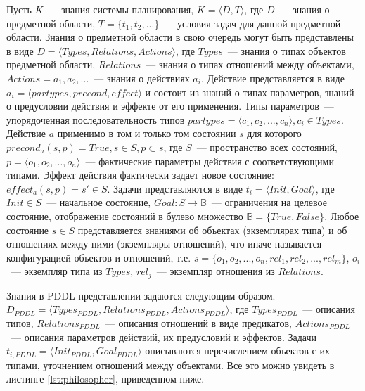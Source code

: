    \par  Пусть $K$~--- знания системы планирования, $K = \langle D, T \rangle$, где $D$~--- знания о предметной области,
    $T = \{t_1, t_2, ...\}$~--- условия задач для данной предметной области.
 Знания о предметной области в свою очередь могут быть представлены в виде $D = \langle Types, Relations, Actions \rangle$, где $Types$~--- знания о типах объектов предметной области, $Relations$~--- знания о типах отношений между объектами, $Actions = {a_1, a_2, ...}$~--- знания о действиях $a_i$.
 Действие представляется в виде $a_i = \langle partypes, precond, effect \rangle$ и состоит из знаний о типах параметров, знаний о предусловии действия и эффекте от его применения.
 Типы параметров~--- упорядоченная последовательность типов $ partypes = \langle c_1, c_2, ..., c_n \rangle, c_i \in Types$.
 Действие $a$ применимо в том и только том состоянии $s$ для которого $precond_a(s,p) = True, s \in S, p \subset s$, где $S$~--- пространство всех состояний, $p = \langle o_1, o_2, ..., o_n \rangle$~--- фактические параметры действия с соответствующими типами.
 Эффект действия фактически задает новое состояние: $effect_a(s, p) = s' \in S$.
 Задачи представляются в виде $t_i = \langle Init, Goal \rangle$, где $Init \in S$~--- начальное состояние, $Goal: S \rightarrow \mathbb{B}$~--- ограничения на целевое состояние, отображение состояний в булево множество $\mathbb{B} = \{ True, False\}$.
 Любое состояние $s \in S$ представляется знаниями об объектах (экземплярах типа) и об отношениях между ними (экземпляры отношений), что иначе называется конфигурацией объектов и отношений, т.е.
 $s = \{o_1, o_2, ..., o_n, rel_1, rel_2, ..., rel_m\}$, $o_i$~--- экземпляр типа из $Types$, $rel_j$~--- экземпляр отношения из $Relations$.
    
    Знания в PDDL-представлении задаются следующим образом.
 $D_{PDDL} = \langle Types_{PDDL}, Relations_{PDDL}, Actions_{PDDL} \rangle$, где $Types_{PDDL}$~--- описания типов, $Relations_{PDDL}$~--- описания отношений в виде предикатов, $Actions_{PDDL}$~--- описания параметров действий, их предусловий и эффектов.
 Задачи  $t_{i, PDDL} = \langle Init_{PDDL}, Goal_{PDDL} \rangle$ описываются перечислением объектов с их типами, уточнением отношений между объектами.
   Все это можно увидеть в листинге \ref{lst:philosopher}, приведенном ниже.

   
    
